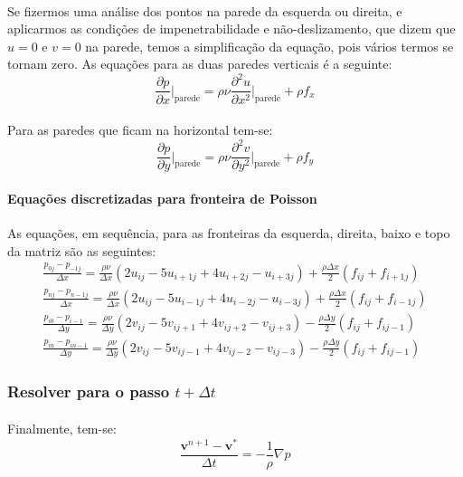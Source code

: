 \documentclass[a4paper,11pt]{article}
\begin{document}
\paragraph{} Se fizermos uma análise dos pontos na parede da esquerda ou
direita, e aplicarmos as condições de impenetrabilidade e não-deslizamento, que
dizem que $u=0$ e $v=0$ na parede, temos a simplificação da equação, pois vários
termos se tornam zero. As equações para as duas paredes verticais é a seguinte:
\begin{equation}
\frac{\partial p}{\partial x}\Bigg|_{\textrm{parede}}=\rho\nu\frac{\partial^2
u}{\partial x^2}\Bigg|_{\textrm{parede}}+\rho f_x
\end{equation}
\paragraph{} Para as paredes que ficam na horizontal tem-se:
\begin{equation}
\frac{\partial p}{\partial y}\Bigg|_{\textrm{parede}}=\rho\nu\frac{\partial^2
v}{\partial y^2}\Bigg|_{\textrm{parede}}+\rho f_y
\end{equation}
\paragraph{Equações discretizadas para fronteira de Poisson} As equações, em
sequência, para as fronteiras da esquerda, direita, baixo e topo da matriz são
as seguintes:
\begin{eqnarray}
\frac{p_{0j}-p_{-1j}}{\Delta x}=\frac{\rho\nu}{\Delta x}(2u_{ij}-5u_{i+1j}+4u_{i+2j}-u_{i+3j})+\frac{\rho\Delta
x}{2}(f_{ij}+f_{i+1j})\\
\frac{p_{nj}-p_{n-1j}}{\Delta x}=\frac{\rho\nu}{\Delta x}(2u_{ij}-5u_{i-1j}+4u_{i-2j}-u_{i-3j})+\frac{\rho\Delta
x}{2}(f_{ij}+f_{i-1j})\\
\frac{p_{i0}-p_{i-1}}{\Delta y}=\frac{\rho\nu}{\Delta y}(2v_{ij}-5v_{ij+1}+4v_{ij+2}-v_{ij+3})-\frac{\rho\Delta
y}{2}(f_{ij}+f_{ij-1})\\
\frac{p_{in}-p_{in-1}}{\Delta y}=\frac{\rho\nu}{\Delta y}(2v_{ij}-5v_{ij-1}+4v_{ij-2}-v_{ij-3})-\frac{\rho\Delta
y}{2}(f_{ij}+f_{ij-1})
\end{eqnarray}

\subsubsection{Resolver para o passo $t+\Delta t$}
\paragraph{} Finalmente, tem-se:
\begin{equation}
\frac{\textbf{v}^{n+1}-\textbf{v}^*}{\Delta t}=-\frac{1}{\rho}\nabla p
\end{equation}
\end{document}
